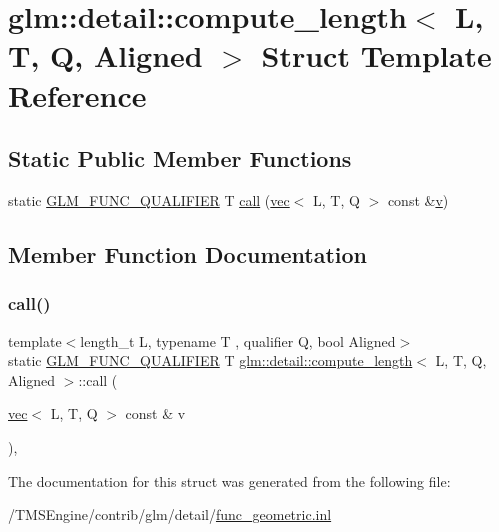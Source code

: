 \hypertarget{structglm_1_1detail_1_1compute__length}{}\section{glm\+:\+:detail\+:\+:compute\+\_\+length$<$ L, T, Q, Aligned $>$ Struct Template Reference}
\label{structglm_1_1detail_1_1compute__length}
\subsection*{Static Public Member Functions}
\begin{DoxyCompactItemize}
\item 
static \hyperlink{setup_8hpp_a33fdea6f91c5f834105f7415e2a64407}{G\+L\+M\+\_\+\+F\+U\+N\+C\+\_\+\+Q\+U\+A\+L\+I\+F\+I\+ER} T \hyperlink{structglm_1_1detail_1_1compute__length_a91fe692eca594f06b642810fd4fc1a6e}{call} (\hyperlink{structglm_1_1vec}{vec}$<$ L, T, Q $>$ const \&\hyperlink{_s_d_l__opengl_8h_a10a82eabcb59d2fcd74acee063775f90}{v})
\end{DoxyCompactItemize}


\subsection{Member Function Documentation}
\mbox{\label{structglm_1_1detail_1_1compute__length_a91fe692eca594f06b642810fd4fc1a6e}} 
\subsubsection{\texorpdfstring{call()}{call()}}
{\footnotesize\ttfamily template$<$length\+\_\+t L, typename T , qualifier Q, bool Aligned$>$ \\
static \hyperlink{setup_8hpp_a33fdea6f91c5f834105f7415e2a64407}{G\+L\+M\+\_\+\+F\+U\+N\+C\+\_\+\+Q\+U\+A\+L\+I\+F\+I\+ER} T \hyperlink{structglm_1_1detail_1_1compute__length}{glm\+::detail\+::compute\+\_\+length}$<$ L, T, Q, Aligned $>$\+::call (\begin{DoxyParamCaption}\item[{\hyperlink{structglm_1_1vec}{vec}$<$ L, T, Q $>$ const \&}]{v }\end{DoxyParamCaption})\hspace{0.3cm}{\ttfamily [inline]}, {\ttfamily [static]}}



The documentation for this struct was generated from the following file\+:\begin{DoxyCompactItemize}
\item 
/\+T\+M\+S\+Engine/contrib/glm/detail/\hyperlink{func__geometric_8inl}{func\+\_\+geometric.\+inl}\end{DoxyCompactItemize}
